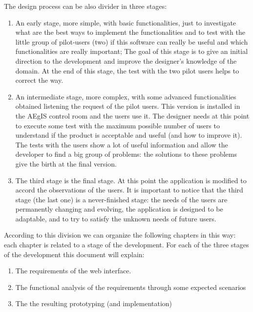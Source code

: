 The design process can be also divider in three stages:

\begin{enumerate}

\item An early stage, more simple, with basic functionalities, just to investigate what are the best ways to implement the functionalities and to test with the little group of pilot-users (two) if this software can really be useful and which functionalities are really important; The goal of this stage is to give an initial direction to the development and improve the designer's knowledge of the domain. At the end of this stage, the test with the two pilot users helps to correct the way.

\item An intermediate stage, more complex, with some advanced functionalities obtained listening the request of the pilot users. This version is installed in the AEgIS control room and the users use it. 
The designer needs at this point to execute some test with the maximum possible number of users to understand if the product is acceptable and useful (and how to improve it). 
The tests with the users show a lot of useful information and allow the developer to find a big group of problems: the solutions to these problems give the birth at the final version. 

\item
The third stage is the final stage. At this point the application is modified to accord the observations of the users. It is important to notice that the third stage (the last one) is a never-finished stage: the needs of the users are permanently changing and evolving, the application is designed to be adaptable, and to try to satisfy the unknown needs of future users.

\end{enumerate}

According to this division we can organize the following chapters in this way:
each chapter is related to a stage of the development.
For each of the three stages of the development this document will explain:

\begin {enumerate}

\item
The requirements of the web interface.

\item
The functional analysis of the requirements through some expected scenarios

\item
The the resulting prototyping (and implementation)  

\end {enumerate} 

 